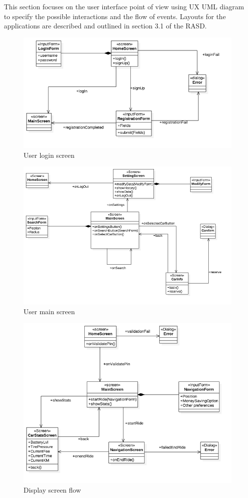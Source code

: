 This section focuses on the user interface point of view using UX UML diagram
to specify the possible interactions and the flow of events.
Layouts for the applications are described and outlined in section 3.1 of the
RASD.

\FloatBarrier
\begin{figure}
\centering
\includegraphics[scale=0.6]{Images/UID/u1.png}
\caption{User login screen}
\end{figure}
\FloatBarrier

\FloatBarrier
\begin{figure}
\centering
\includegraphics[scale=0.6]{Images/UID/u2.png}
\caption{User main screen}
\end{figure}
\FloatBarrier

\FloatBarrier
\begin{figure}
\centering
\includegraphics[scale=0.6]{Images/UID/u3.png}
\caption{Display screen flow}
\end{figure}
\FloatBarrier



